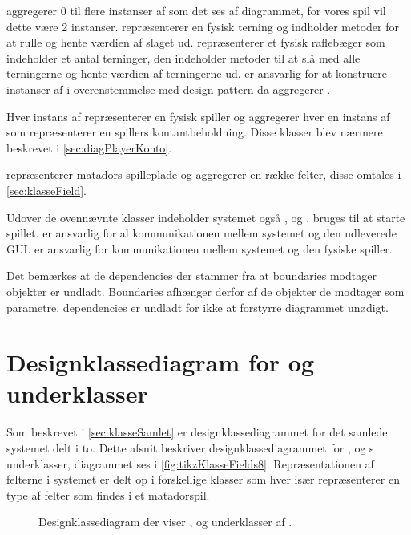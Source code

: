  aggregerer 0 til flere instanser af  som det ses af diagrammet, for vores spil vil dette være 2 instanser.  repræsenterer en fysisk terning og indholder metoder for at rulle og hente værdien af slaget ud.  repræsenterer et fysisk raflebæger som indeholder et antal terninger, den indeholder metoder til at slå med alle terningerne og hente værdien af terningerne ud.  er ansvarlig for at konstruere instanser af  i overenstemmelse med design pattern  da  aggregerer .

Hver instans af  repræsenterer en fysisk spiller og aggregerer hver en instans af  som repræsenterer en spillers kontantbeholdning. Disse klasser blev nærmere beskrevet i \vref{sec:diagPlayerKonto}.

 repræsenterer matadors spilleplade og aggregerer en række felter, disse omtales i \vref{sec:klasseField}.

Udover de ovennævnte klasser indeholder systemet også ,  og .  bruges til at starte spillet.  er ansvarlig for al kommunikationen mellem systemet og den udleverede GUI.  er ansvarlig for kommunikationen mellem systemet og den fysiske spiller.

Det bemærkes at de dependencies der stammer fra at boundaries modtager objekter er undladt. Boundaries afhænger derfor af de objekter de modtager som parametre, dependencies er undladt for ikke at forstyrre diagrammet unødigt.

\section{Designklassediagram for  og underklasser}\label{sec:klasseField}

Som beskrevet i \vref{sec:klasseSamlet} er designklassediagrammet for det samlede systemet delt i to. Dette afsnit beskriver designklassediagrammet for ,  og s underklasser, diagrammet ses i \vref{fig:tikzKlasseFields8}. Repræsentationen af felterne i systemet er delt op i forskellige klasser som hver især repræsenterer en type af felter som findes i et matadorspil.

\begin{figure}
\caption{Designklassediagram der viser ,  og underklasser af .}\label{fig:tikzKlasseFields8}
\centering

\end{figure}

